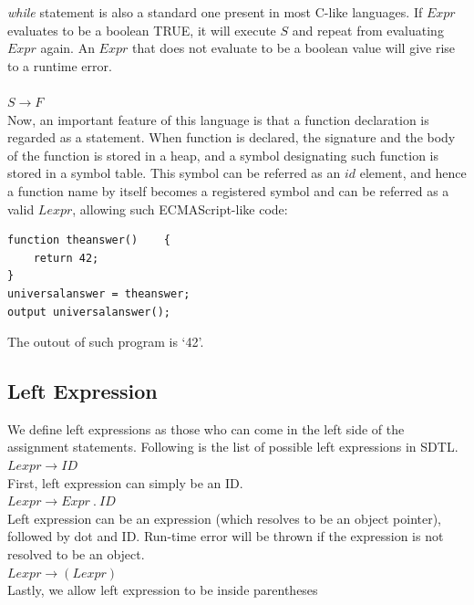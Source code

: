 \documentclass[a4paper,12pt]{article}
\begin{document}
\textit{while} statement is also a standard one present in most C-like languages. If $Expr$ evaluates to be a boolean TRUE, it will execute $S$ and repeat from evaluating $Expr$ again. An $Expr$ that does not evaluate to be a boolean value will give rise to a runtime error.\\\\
$S \rightarrow F$\\
Now, an important feature of this language is that a function declaration is regarded as a statement. When function is declared, the signature and the body of the function is stored in a heap, and a symbol designating such function is stored in a symbol table. This symbol can be referred as an $id$ element, and hence a function name by itself becomes a registered symbol and can be referred as a valid $Lexpr$, allowing such ECMAScript-like code:\\
\medskip
\begin{lstlisting}[caption=Function declaration as a statement]
function theanswer()	{
	return 42;
}
universalanswer = theanswer;
output universalanswer();
\end{lstlisting}
The outout of such program is `42'.
\subsection{Left Expression}
We define left expressions as those who can come in the left side of the assignment statements. Following is the list of possible left expressions in SDTL.\\
$Lexpr \rightarrow ID$\\
First, left expression can simply be an ID.\\
$Lexpr \rightarrow Expr\ .\ ID$\\
Left expression can be an expression (which resolves to be an object pointer), followed by dot and ID. Run-time error will be thrown if the expression is not resolved to be an object.\\
$Lexpr \rightarrow (Lexpr)$\\
Lastly, we allow left expression to be inside parentheses\\
\end{document}
